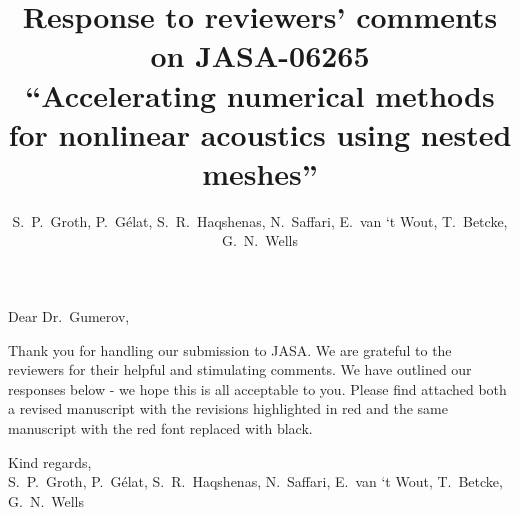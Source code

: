 \documentclass[11pt]{article}
\begin{document}
\title{Response to reviewers' comments on JASA-06265 \\
``Accelerating numerical methods for nonlinear acoustics using nested meshes''}
\author{S.~P.~Groth, P.~G\'elat, S.~R.~Haqshenas, N.~Saffari, E.~van `t Wout, T.~Betcke, G.~N.~Wells}
\maketitle

Dear Dr.~Gumerov,

Thank you for handling our submission to JASA. We are grateful to the reviewers 
for their helpful and stimulating comments. 
We have outlined our responses below - we hope this is all acceptable to you. 
Please find attached both a revised manuscript with the revisions highlighted 
in red and the same manuscript with the red font replaced with black. 

Kind regards,\\
S.~P.~Groth, P.~G\'elat, S.~R.~Haqshenas, N.~Saffari, E.~van `t Wout, T.~Betcke, G.~N.~Wells
\end{document}
